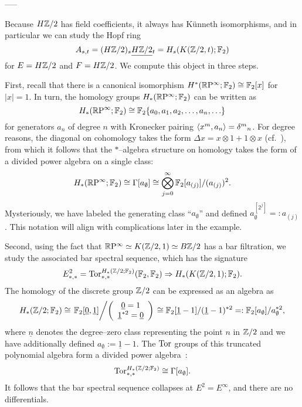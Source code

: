 -----

\begin{example}
Because $H\mathbb Z/2$ has field coefficients, it always has K\"unneth isomorphisms, and in particular we can study the Hopf ring \[A_{s, t} = (H\mathbb Z/2)_s \smash{\underline{H\mathbb Z/2}}_{t} = H_s(K(\mathbb Z/2, t); \mathbb F_2)\] for $E = H\mathbb Z/2$ and $F = H\mathbb Z/2$.  We compute this object in three steps.

First, recall that there is a canonical isomorphism $H^*(\mathbb R\mathrm P^\infty; \mathbb F_2) \cong \mathbb F_2[x]$ for $|x| = 1$.  In turn, the homology groups $H_*(\mathbb R\mathrm P^\infty; \mathbb F_2)$ can be written as \[H_*(\mathbb R\mathrm P^\infty; \mathbb F_2) \cong \mathbb F_2\{a_0, a_1, a_2, \ldots, a_n, \ldots\}\] for generators $a_n$ of degree $n$ with Kronecker pairing $\langle x^m, a_n\rangle = \delta{}^m{}_n$.  For degree reasons, the diagonal on cohomology takes the form $\Delta x = x \otimes 1 + 1 \otimes x$ (cf.\ ), from which it follows that the $\ast$--algebra structure on homology takes the form of a divided power algebra on a single class: \[H_*(\mathbb R\mathrm P^\infty; \mathbb F_2) \cong \Gamma[a_\emptyset] \cong \bigotimes_{j=0}^\infty \mathbb F_2[a_{(j)}] / (a_{(j)})^2.\]  Mysteriously, we have labeled the generating class ``$a_\emptyset$'' and defined $a_\emptyset^{[2^j]} =: a_{(j)}$. This notation will align with complications later in the example.

Second, using the fact that $\mathbb R\mathrm P^\infty \simeq K(\mathbb Z/2, 1) \simeq B\mathbb Z/2$ has a bar filtration, we study the associated bar spectral sequence, which has the signature \[E^2_{*, *} = \operatorname{Tor}^{H_*(\mathbb Z/2; \mathbb F_2)}_{*, *}(\mathbb F_2, \mathbb F_2) \Rightarrow H_*(K(\mathbb Z/2, 1); \mathbb F_2).\]  The homology of the discrete group $\mathbb Z/2$ can be expressed as an algebra as
\[
H_*(\mathbb Z/2; \mathbb F_2) \cong \left. \mathbb F_2[\underline 0, \underline 1] \middle/ \left(\begin{array}{c} \underline 0 = 1 \\ \underline 1^{\ast 2} = \underline 0\end{array}\right) \right. \cong \mathbb F_2[\underline 1 - 1] / (\underline 1 - 1)^{\ast 2} =: \mathbb F_2[a_\emptyset] / a_\emptyset^{\ast 2},
\]
where $\underline n$ denotes the degree--zero class representing the point $n$ in $\mathbb Z/2$ and we have additionally defined $a_\emptyset := \underline 1 - 1$.  The $\operatorname{Tor}$ groups of this truncated polynomial algebra form a divided power algebra~\cite{TateResolutions}: \[\operatorname{Tor}^{H_*(\mathbb Z/2; \mathbb F_2)}_{*, *} \cong \Gamma[a_\emptyset].\]  It follows that the bar spectral sequence collapses at $E^2 = E^\infty$, and there are no differentials.


\end{example}
